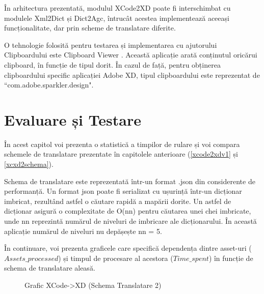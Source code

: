 În arhitectura prezentată, modulul XCode2XD poate fi interschimbat cu modulele Xml2Dict și Dict2Agc, întrucât acestea implementează aceeași funcționalitate, dar prin scheme de translatare diferite.

O tehnologie folosită pentru testarea și implementarea cu ajutorului Clipboardului este Clipboard Viewer \cite{clipboard}. Această aplicație arată conținutul oricărui clipboard, în funcție de tipul dorit. În cazul de față, pentru obținerea clipboardului specific aplicației Adobe XD, tipul clipboardului este reprezentat de ``com.adobe.sparkler.design".


\chapter{Evaluare și Testare}

În acest capitol voi prezenta o statistică a timpilor de rulare și voi compara schemele de translatare prezentate în capitolele anterioare (\ref{xcode2xdv1} și \ref{xcxd2schema}).

Schema de translatare este reprezentată într-un format .json din considerente de performanță. Un format json poate fi serializat cu ușurință într-un dicționar imbricat, rezultând astfel o căutare rapidă a mapării dorite. Un astfel de dicționar asigură o complexitate de O(nn) pentru căutarea unei chei imbricate, unde nn reprezintă numărul de niveluri de imbricare ale dicționarului. În această aplicație numărul de niveluri nu depășește nn = 5.  

În continuare, voi prezenta graficele care specifică dependența dintre asset-uri ($Assets\_processed$) și timpul de procesare al acestora ($Time\_spent$) în funcție de schema de translatare aleasă.

\begin{figure}[!htbp]
\centering
\caption{Grafic XCode->XD (Schema Translatare 2)} \label{fig:Grafic1}
\end{figure}

